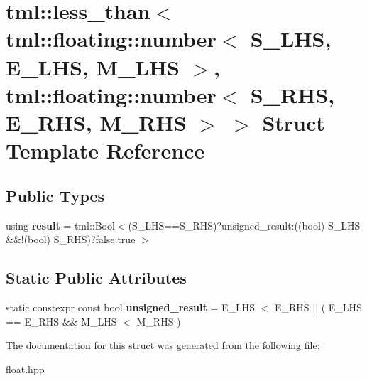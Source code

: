 \hypertarget{structtml_1_1less__than_3_01tml_1_1floating_1_1number_3_01S__LHS_00_01E__LHS_00_01M__LHS_01_4_00bef4c0e2d66ab84bbc2d12bd37c56f1f}{\section{tml\+:\+:less\+\_\+than$<$ tml\+:\+:floating\+:\+:number$<$ S\+\_\+\+L\+H\+S, E\+\_\+\+L\+H\+S, M\+\_\+\+L\+H\+S $>$, tml\+:\+:floating\+:\+:number$<$ S\+\_\+\+R\+H\+S, E\+\_\+\+R\+H\+S, M\+\_\+\+R\+H\+S $>$ $>$ Struct Template Reference}
\label{structtml_1_1less__than_3_01tml_1_1floating_1_1number_3_01S__LHS_00_01E__LHS_00_01M__LHS_01_4_00bef4c0e2d66ab84bbc2d12bd37c56f1f}
}
\subsection*{Public Types}
\begin{DoxyCompactItemize}
\item 
\hypertarget{structtml_1_1less__than_3_01tml_1_1floating_1_1number_3_01S__LHS_00_01E__LHS_00_01M__LHS_01_4_00bef4c0e2d66ab84bbc2d12bd37c56f1f_ade93e70160bb0879d08fc3fa4570ab94}{using {\bfseries result} = tml\+::\+Bool$<$(S\+\_\+\+L\+H\+S==S\+\_\+\+R\+H\+S)?unsigned\+\_\+result\+:((bool) S\+\_\+\+L\+H\+S \&\&!(bool) S\+\_\+\+R\+H\+S)?false\+:true $>$}\label{structtml_1_1less__than_3_01tml_1_1floating_1_1number_3_01S__LHS_00_01E__LHS_00_01M__LHS_01_4_00bef4c0e2d66ab84bbc2d12bd37c56f1f_ade93e70160bb0879d08fc3fa4570ab94}

\end{DoxyCompactItemize}
\subsection*{Static Public Attributes}
\begin{DoxyCompactItemize}
\item 
\hypertarget{structtml_1_1less__than_3_01tml_1_1floating_1_1number_3_01S__LHS_00_01E__LHS_00_01M__LHS_01_4_00bef4c0e2d66ab84bbc2d12bd37c56f1f_a69a0279d67e0ffb3b0b3f6304c048ce2}{static constexpr const bool {\bfseries unsigned\+\_\+result} = E\+\_\+\+L\+H\+S $<$ E\+\_\+\+R\+H\+S $\vert$$\vert$ ( E\+\_\+\+L\+H\+S == E\+\_\+\+R\+H\+S \&\& M\+\_\+\+L\+H\+S $<$ M\+\_\+\+R\+H\+S )}\label{structtml_1_1less__than_3_01tml_1_1floating_1_1number_3_01S__LHS_00_01E__LHS_00_01M__LHS_01_4_00bef4c0e2d66ab84bbc2d12bd37c56f1f_a69a0279d67e0ffb3b0b3f6304c048ce2}

\end{DoxyCompactItemize}


The documentation for this struct was generated from the following file\+:\begin{DoxyCompactItemize}
\item 
float.\+hpp\end{DoxyCompactItemize}
